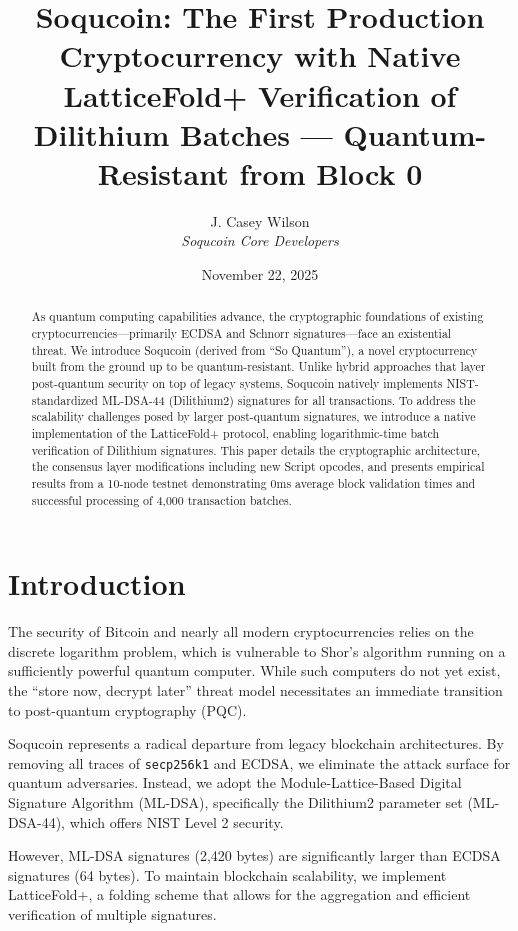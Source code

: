 \documentclass[10pt, twocolumn]{article}
\title{\textbf{Soqucoin: The First Production Cryptocurrency with Native LatticeFold+ Verification of Dilithium Batches — Quantum-Resistant from Block 0}}
\author{J. Casey Wilson \\ \textit{Soqucoin Core Developers}}
\date{November 22, 2025}
\begin{document}
\maketitle

\begin{abstract}
As quantum computing capabilities advance, the cryptographic foundations of existing cryptocurrencies—primarily ECDSA and Schnorr signatures—face an existential threat. We introduce Soqucoin (derived from ``So Quantum''), a novel cryptocurrency built from the ground up to be quantum-resistant. Unlike hybrid approaches that layer post-quantum security on top of legacy systems, Soqucoin natively implements NIST-standardized ML-DSA-44 (Dilithium2) signatures for all transactions. To address the scalability challenges posed by larger post-quantum signatures, we introduce a native implementation of the LatticeFold+ protocol, enabling logarithmic-time batch verification of Dilithium signatures. This paper details the cryptographic architecture, the consensus layer modifications including new Script opcodes, and presents empirical results from a 10-node testnet demonstrating 0ms average block validation times and successful processing of 4,000 transaction batches.
\end{abstract}

\section{Introduction}
The security of Bitcoin and nearly all modern cryptocurrencies relies on the discrete logarithm problem, which is vulnerable to Shor's algorithm running on a sufficiently powerful quantum computer. While such computers do not yet exist, the ``store now, decrypt later'' threat model necessitates an immediate transition to post-quantum cryptography (PQC).

Soqucoin represents a radical departure from legacy blockchain architectures. By removing all traces of \texttt{secp256k1} and ECDSA, we eliminate the attack surface for quantum adversaries. Instead, we adopt the Module-Lattice-Based Digital Signature Algorithm (ML-DSA), specifically the Dilithium2 parameter set (ML-DSA-44), which offers NIST Level 2 security.

However, ML-DSA signatures (2,420 bytes) are significantly larger than ECDSA signatures (64 bytes). To maintain blockchain scalability, we implement LatticeFold+, a folding scheme that allows for the aggregation and efficient verification of multiple signatures.
\end{document}
